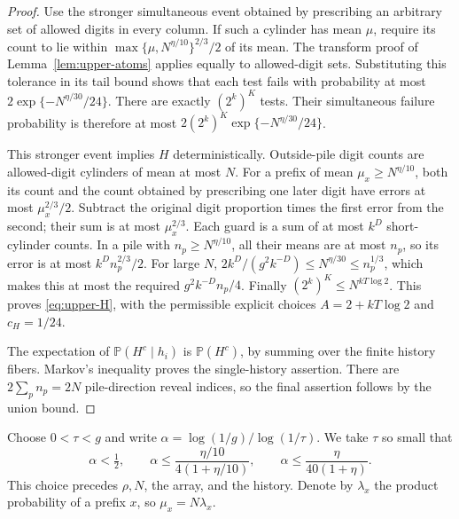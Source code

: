 \documentclass[11pt]{article}
\numberwithin{equation}{section}
\theoremstyle{definition}
\theoremstyle{remark}
\newcommand{\Pp}{\mathbb P}
\newcommand{\1}{\mathbf 1}
\begin{document}
\begin{proof}
Use the stronger simultaneous event obtained by prescribing an
arbitrary set of allowed digits in every column. If such a cylinder
has mean $\mu$, require its count to lie within
$\max\{\mu,N^{\eta/10}\}^{2/3}/2$ of its mean.
The transform proof of Lemma~\ref{lem:upper-atoms} applies equally
to allowed-digit sets. Substituting this tolerance in its tail
bound shows that each test fails with probability at most
$2\exp\{-N^{\eta/30}/24\}$.
There are exactly $(2^k)^K$ tests. Their simultaneous failure
probability is therefore at most
$2(2^k)^K\exp\{-N^{\eta/30}/24\}$.

This stronger event implies $H$ deterministically. Outside-pile
digit counts are allowed-digit cylinders of mean at most $N$.
For a prefix of mean $\mu_x\ge N^{\eta/10}$, both its count and
the count obtained by prescribing one later digit have errors at
most $\mu_x^{2/3}/2$. Subtract the original digit proportion times
the first error from the second; their sum is at most
$\mu_x^{2/3}$. Each guard is a sum of at most $k^D$ short-cylinder
counts. In a pile with $n_p\ge N^{\eta/10}$, all their means are
at most $n_p$, so its error is at most $k^D n_p^{2/3}/2$.
For large $N$,
$2k^D/(g^2k^{-D})\le N^{\eta/30}\le n_p^{1/3}$,
which makes this at most the required $g^2k^{-D}n_p/4$.
Finally $(2^k)^K\le N^{kT\log2}$. This proves
\eqref{eq:upper-H}, with the permissible explicit choices
$A=2+kT\log2$ and $c_H=1/24$.

The expectation of $\Pp(H^c\mid h_i)$ is $\Pp(H^c)$, by summing
over the finite history fibers. Markov's inequality proves the
single-history assertion. There are $2\sum_p n_p=2N$ pile-direction
reveal indices, so the final assertion follows by the union bound.
\end{proof}

Choose $0<\tau<g$ and write
$\alpha=\log(1/g)/\log(1/\tau)$. We take $\tau$ so small that
\begin{equation}\label{eq:upper-alpha}
 \alpha<\tfrac12,\qquad
 \alpha\le\frac{\eta/10}{4(1+\eta/10)},\qquad
 \alpha\le\frac{\eta}{40(1+\eta)}.
\end{equation}
This choice precedes $\rho,N$, the array, and the history. Denote by
$\lambda_x$ the product probability of a prefix $x$, so
$\mu_x=N\lambda_x$.
\end{document}
